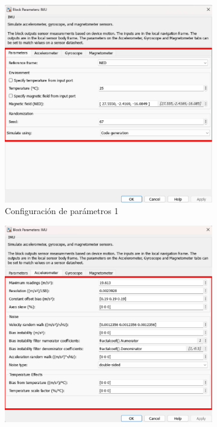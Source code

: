 \begin{figure}[htbp]
\begin{subfigure}[b]{0.35\textwidth}
        \includegraphics[width=\textwidth]{fig/Capitulo5/Caso_de_estudio_IMU/Generador_de_archivos/configuracion_parametros_IMU_01.pdf}
        \caption{Configuración de parámetros 1}
        \label{fig:parametros_IMU_01}
    \end{subfigure}
    \hfill
    \begin{subfigure}[b]{0.35\textwidth}
        \centering
        \includegraphics[width=\textwidth]{fig/Capitulo5/Caso_de_estudio_IMU/Generador_de_archivos/configuracion_parametros_IMU_02.pdf}

\end{subfigure}
\end{figure}
